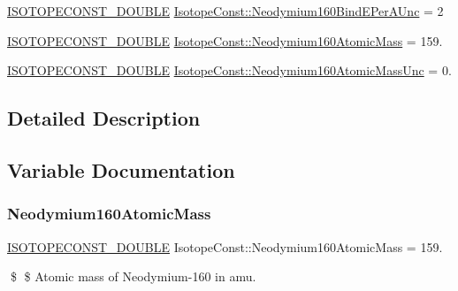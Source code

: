 \begin{DoxyCompactItemize}
\mbox{\hyperlink{group___isotope_const-_macros_ga8f45a7272ce02c0b4c65c44636ed719a}{I\+S\+O\+T\+O\+P\+E\+C\+O\+N\+S\+T\+\_\+\+D\+O\+U\+B\+LE}} \mbox{\hyperlink{group___isotope_const-_neodymium-_nd160_gadc2c941bff454b26342998d69a918ab8}{Isotope\+Const\+::\+Neodymium160\+Bind\+E\+Per\+A\+Unc}} = 2
\item 
\mbox{\hyperlink{group___isotope_const-_macros_ga8f45a7272ce02c0b4c65c44636ed719a}{I\+S\+O\+T\+O\+P\+E\+C\+O\+N\+S\+T\+\_\+\+D\+O\+U\+B\+LE}} \mbox{\hyperlink{group___isotope_const-_neodymium-_nd160_gaedb6e38748743d053045f3c8bdeb831c}{Isotope\+Const\+::\+Neodymium160\+Atomic\+Mass}} = 159.
\item 
\mbox{\hyperlink{group___isotope_const-_macros_ga8f45a7272ce02c0b4c65c44636ed719a}{I\+S\+O\+T\+O\+P\+E\+C\+O\+N\+S\+T\+\_\+\+D\+O\+U\+B\+LE}} \mbox{\hyperlink{group___isotope_const-_neodymium-_nd160_ga3e8ee06d36cdb8cbdf70b9cac78f3e82}{Isotope\+Const\+::\+Neodymium160\+Atomic\+Mass\+Unc}} = 0.
\end{DoxyCompactItemize}


\subsection{Detailed Description}


\subsection{Variable Documentation}
\mbox{\label{group___isotope_const-_neodymium-_nd160_gaedb6e38748743d053045f3c8bdeb831c}} 
\subsubsection{\texorpdfstring{Neodymium160\+Atomic\+Mass}{Neodymium160AtomicMass}}
{\footnotesize\ttfamily \mbox{\hyperlink{group___isotope_const-_macros_ga8f45a7272ce02c0b4c65c44636ed719a}{I\+S\+O\+T\+O\+P\+E\+C\+O\+N\+S\+T\+\_\+\+D\+O\+U\+B\+LE}} Isotope\+Const\+::\+Neodymium160\+Atomic\+Mass = 159.}

\$ \$ Atomic mass of Neodymium-\/160 in amu. \mbox{\label{group___isotope_const-_neodymium-_nd160_ga3e8ee06d36cdb8cbdf70b9cac78f3e82}} 
